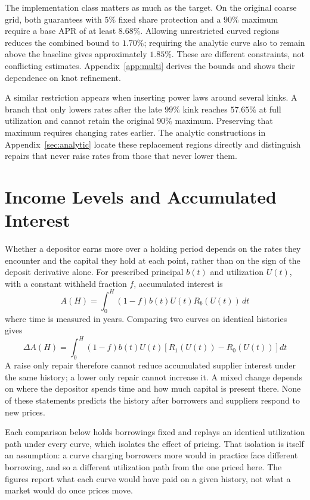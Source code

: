 \documentclass[11pt,a4paper]{article}
\begin{document}
The implementation class matters as much as the target. On the original coarse grid, both guarantees with $5\%$ fixed share protection and a $90\%$ maximum require a base APR of at least $8.68\%$. Allowing unrestricted curved regions reduces the combined bound to $1.70\%$; requiring the analytic curve also to remain above the baseline gives approximately $1.85\%$. These are different constraints, not conflicting estimates. Appendix~\ref{app:multi} derives the bounds and shows their dependence on knot refinement.

A similar restriction appears when inserting power laws around several kinks. A branch that only lowers rates after the late $99\%$ kink reaches $57.65\%$ at full utilization and cannot retain the original $90\%$ maximum. Preserving that maximum requires changing rates earlier. The analytic constructions in Appendix~\ref{sec:analytic} locate these replacement regions directly and distinguish repairs that never raise rates from those that never lower them.

\section{Income Levels and Accumulated Interest}
\label{sec:earnings}

Whether a depositor earns more over a holding period depends on the rates they encounter and the capital they hold at each point, rather than on the sign of the deposit derivative alone. For prescribed principal $b(t)$ and utilization $U(t)$, with a constant withheld fraction $f$, accumulated interest is
\[
A(H)=\int_0^H(1-f)b(t)U(t)R_b(U(t))\,dt
\]
where time is measured in years. Comparing two curves on identical histories gives
\[
\Delta A(H)=\int_0^H(1-f)b(t)U(t)
\left[R_1(U(t))-R_0(U(t))\right]dt
\]
A raise only repair therefore cannot reduce accumulated supplier interest under the same history; a lower only repair cannot increase it. A mixed change depends on where the depositor spends time and how much capital is present there. None of these statements predicts the history after borrowers and suppliers respond to new prices.

Each comparison below holds borrowings fixed and replays an identical utilization path under every curve, which isolates the effect of pricing. That isolation is itself an assumption: a curve charging borrowers more would in practice face different borrowing, and so a different utilization path from the one priced here. The figures report what each curve would have paid on a given history, not what a market would do once prices move.
\end{document}
